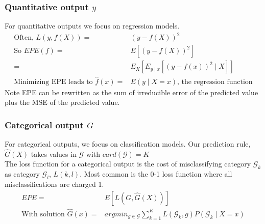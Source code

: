 \documentclass{article}
\begin{document}
\subsubsection{Quantitative output $y$}
For quantitative outputs we focus on regression models. 
\begin{align*}
  \textrm{Often, } L(y, f(X)) =& (y - f(X))^2\\
  \textrm{So } EPE(f) =& E[(y - f(X))^2]\\
  =& E_X[E_{y\mid x}[(y - f(x))^2 \mid X]]\\
  \textrm{Minimizing EPE leads to } \hat{f}(x) =& E(y \mid X=x) \textrm{, the regression function}
\end{align*}
Note EPE can be rewritten as the sum of irreducible error of the predicted value plus the MSE of the predicted value. 

\subsubsection{Categorical output $G$}
For categorical outputs, we focus on classification models. Our prediction rule, $\hat{G}(X)$ takes values in $\mathcal{G}$ with $card(\mathcal{G}) = K$\\
The loss function for a categorical output is the cost of misclassifying category $\mathcal{G}_k$ as category $\mathcal{G}_l$, $L(k, l)$. Most common is the 0-1 loss function where all misclassifications are charged 1. 
\begin{align*}
  EPE =& E[L(G, \hat{G}(X))]\\
  \textrm{With solution } \hat{G}(x) =& argmin_{g\in\mathcal{G}}\sum_{k=1}^KL(\mathcal{G}_k, g)P(\mathcal{G}_k \mid X = x) 
\end{align*}
\end{document}
